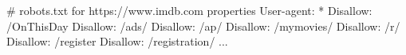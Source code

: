 \begin{Schunk}
\begin{Soutput}
# robots.txt for https://www.imdb.com properties
User-agent: *
Disallow: /OnThisDay
Disallow: /ads/
Disallow: /ap/
Disallow: /mymovies/
Disallow: /r/
Disallow: /register
Disallow: /registration/
...
\end{Soutput}
\end{Schunk}

